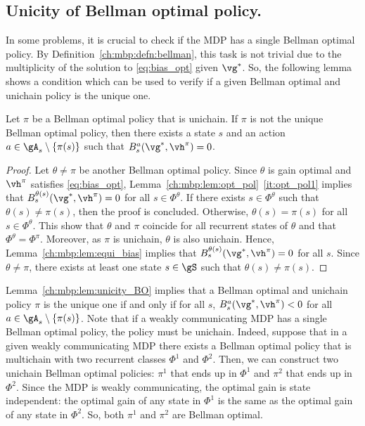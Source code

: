\subsection{Unicity of Bellman optimal policy.}
\label{ssec:unicity}

In some problems, it is crucial to check if the MDP has a single Bellman optimal policy.
By Definition~\ref{ch:mbp:defn:bellman}, this task is not trivial due to the multiplicity of the solution to \eqref{eq:bias_opt} given $\vg^*$.
So, the following lemma shows a condition which can be used to verify if a given Bellman optimal and unichain policy is the unique one.

\begin{lem}
    \label{ch:mbp:lem:unicity_BO}
    Let $\pi$ be a Bellman optimal policy that is unichain. If $\pi$ is not the unique Bellman optimal policy, then there exists a state $s$ and an action $a\in\gA_s\setminus\{\pi(s)\}$ such that $B_s^a(\vg^*,\vh^\pi)=0$.
\end{lem}

\begin{proof}
    Let $\theta\neq\pi$ be another Bellman optimal policy. Since $\theta$ is gain optimal and $\vh^\pi$ satisfies \eqref{eq:bias_opt}, Lemma~\ref{ch:mbp:lem:opt_pol}~\ref{it:opt_pol1} implies that $B_s^{\theta(s)}(\vg^*,\vh^\pi) =0$ for all $s\in\Phi^\theta$. If there exists $s\in\Phi^\theta$ such that $\theta(s)\neq\pi(s)$, then the proof is concluded.  Otherwise, $\theta(s)=\pi(s)$ for all $s\in\Phi^\theta$.
    This show that $\theta$ and $\pi$ coincide for all recurrent states of $\theta$ and that $\Phi^\theta=\Phi^\pi$. Moreover, as $\pi$ is unichain, $\theta$ is also unichain. Hence, Lemma~\ref{ch:mbp:lem:equi_bias} implies that $B_s^{\theta(s)}(\vg^*, \vh^\pi)=0$ for all $s$. Since $\theta\neq\pi$, there exists at least one state $s\in\gS$ such that $\theta(s)\neq\pi(s)$.
\end{proof}
Lemma~\ref{ch:mbp:lem:unicity_BO} implies that a Bellman optimal and unichain policy $\pi$ is the unique one if and only if for all $s$, $B_s^a(\vg^*, \vh^\pi)<0$ for all $a\in\gA_s\setminus\{\pi(s)\}$.
Note that if a weakly communicating MDP has a single Bellman optimal policy, the policy must be unichain.
Indeed, suppose that in a given weakly communicating MDP there exists a Bellman optimal policy that is multichain with two recurrent classes $\Phi^1$ and $\Phi^2$.
Then, we can construct two unichain Bellman optimal policies:
$\pi^1$ that ends up in $\Phi^1$ and $\pi^2$ that ends up in $\Phi^2$.
Since the MDP is weakly communicating, the optimal gain is state independent: the optimal gain of any state in $\Phi^1$ is the same as the optimal gain of any state in $\Phi^2$.
So, both $\pi^1$ and $\pi^2$ are Bellman optimal.

